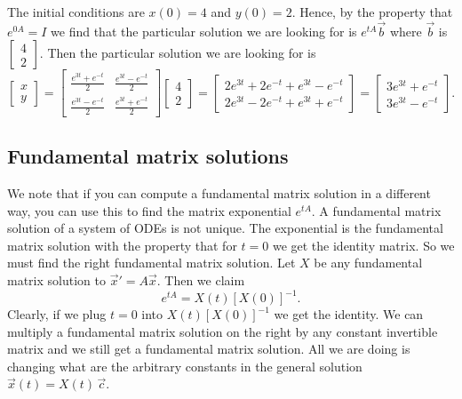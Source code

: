\documentclass{ximera}
\begin{document}
\begin{example}
    The initial conditions are $x(0) = 4$ and $y(0) = 2$.  Hence, by the property that $e^{0A} = I$ we find that the particular solution we are looking for is $e^{tA} \vec{b}$ where $\vec{b}$ is 
    $\left[
        \begin{smallmatrix} 
            4 \\ 
            2 
        \end{smallmatrix} 
    \right]$.
    Then the particular solution we are looking for is
    \begin{equation*}
        \begin{bmatrix}
            x \\ 
            y
        \end{bmatrix}
        =
        \begin{bmatrix}
            \frac{e^{3t}+e^{-t}}{2} & \frac{e^{3t}-e^{-t}}{2} \\
            \frac{e^{3t}-e^{-t}}{2} & \frac{e^{3t}+e^{-t}}{2}
        \end{bmatrix}
        \begin{bmatrix}
            4 \\ 
            2
        \end{bmatrix}
        =
        \begin{bmatrix}
            2e^{3t}+2e^{-t} + e^{3t}-e^{-t} \\
            2e^{3t}-2e^{-t} + e^{3t}+e^{-t}
        \end{bmatrix}
        =
        \begin{bmatrix}
            3e^{3t}+e^{-t} \\
            3e^{3t}-e^{-t}
        \end{bmatrix} .
    \end{equation*}
\end{example}

\subsection{Fundamental matrix solutions}

We note that if you can compute a fundamental matrix solution in a different way, you can use this to find the matrix exponential $e^{tA}$. A fundamental matrix solution of a system of ODEs is not unique.  The exponential is the fundamental matrix solution with the property that for $t=0$ we get the identity matrix.  So we must find the right fundamental matrix solution.  Let $X$ be any fundamental matrix solution to ${\vec{x}}' = A \vec{x}$.  Then we claim
\begin{equation*}
    e^{tA} = X(t) \left[ X(0) \right]^{-1} .
\end{equation*}
Clearly, if we plug $t=0$ into $X(t) \left[ X(0) \right]^{-1}$ we get the identity. We can multiply a fundamental matrix solution on the right by any constant invertible matrix and we still get a fundamental matrix solution. All we are doing is changing what are the arbitrary constants in the general solution $\vec{x}(t) = X(t)\, \vec{c}$.
\end{document}
